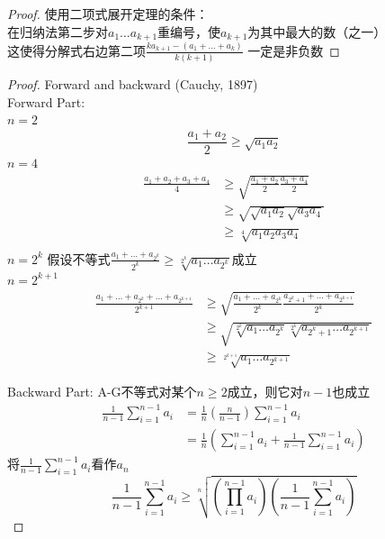 \documentclass[10pt,a4paper]{book}
\begin{document}
\begin{proof}
	使用二项式展开定理的条件：\\
	在归纳法第二步对$a_1 \dots a_{k+1}  $重编号，使$ a_{k+1} $为其中最大的数（之一）\\
	这使得分解式右边第二项$ \frac{ka_{k+1}-(a_1+\dots+a_k)}{k(k+1)} $ 一定是非负数
	\end{proof}
	
	
	\begin{proof}\label{证明 2}
	Forward and backward (Cauchy, 1897)\\
	Forward Part:\\
	$ n=2 $ 
	\begin{equation}
		\frac{a_1+a_2}{2}\geq \sqrt{a_1a_2}
	\end{equation}
	$ n=4 $ 
	\begin{equation}
		\begin{aligned}
			\frac{a_1+a_2+a_3+a_4}{4}
			&\geq \sqrt{\frac{a_1+a_2}{2}\frac{a_3+a_4}{2}}\\
			&\geq \sqrt{\sqrt{a_1a_2}\sqrt{a_3a_4}}\\
			&\geq \sqrt[4]{a_1a_2a_3a_4}\\
		\end{aligned}
	\end{equation}
	$ n=2^k $ 假设不等式$ \frac{a_1+\dots +a_{2^k}}{2^k}\geq \sqrt[2^k]{a_1\dots a_{2^k}} $成立\\
	$ n=2^{k+1} $
	\begin{equation}
		\begin{aligned}
			\frac{a_1+\dots+a_{2^k}+\dots+a_{2^{k+1}}}{2^{k+1}}
			&\geq \sqrt{\frac{a_1+\dots +a_{2^k}}{2^k}\frac{a_{2^k+1}+\dots +a_{2^{k+1}}}{2^k}}\\
			&\geq \sqrt{\sqrt[2^k]{a_1\dots a_{2^k}}\sqrt[2^k]{a_{2^k+1}\dots a_{2^{k+1}}}}\\
			&\geq \sqrt[2^{k+1}]{a_1\dots a_{2^{k+1}}}
		\end{aligned}
	\end{equation}
	
	Backward Part:
	A-G不等式对某个$ n\geq 2 $成立，则它对$ n-1 $也成立
	\begin{equation}
		\begin{aligned}
			\frac{1}{n-1}\sum_{i=1}^{n-1}a_i 
			&= \frac{1}{n}(\frac{n}{n-1})\sum_{i=1}^{n-1}a_i\\
			&=\frac{1}{n}(\sum_{i=1}^{n-1}a_i+\frac{1}{n-1}\sum_{i=1}^{n-1}a_i)
		\end{aligned}
	\end{equation}
	将$ \frac{1}{n-1}\sum_{i=1}^{n-1}a_i $看作$ a_n $
	\begin{equation}
		\frac{1}{n-1}\sum_{i=1}^{n-1}a_i
		\geq \sqrt[n]{(\prod_{i=1}^{n-1}a_i) (\frac{1}{n-1}\sum_{i=1}^{n-1}a_i)}
	\end{equation}
	

\end{proof}
\end{document}
